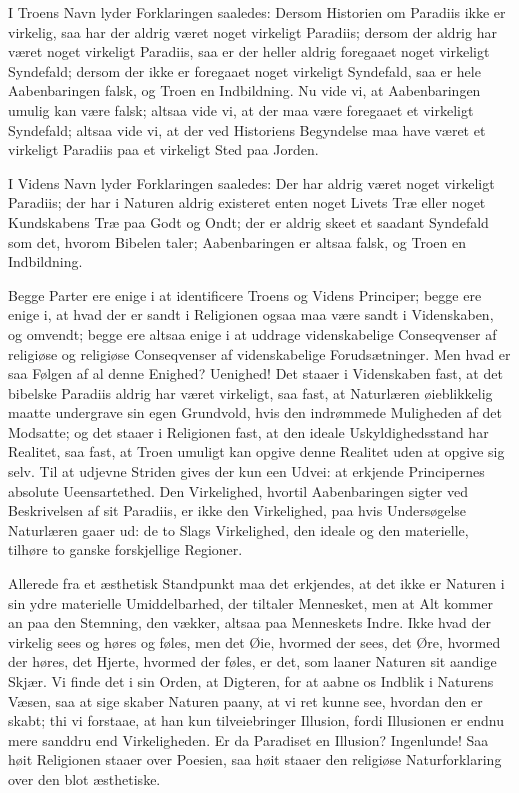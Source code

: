 \documentclass[12pt]{book}
\begin{document}
I Troens Navn lyder Forklaringen saaledes: Dersom Historien om
Paradiis ikke er virkelig, saa har der aldrig været noget virkeligt
Paradiis; dersom der aldrig har været noget virkeligt Paradiis, saa
er der heller aldrig foregaaet noget virkeligt Syndefald; dersom der
ikke er foregaaet noget virkeligt Syndefald, saa er hele
Aabenbaringen falsk, og Troen en Indbildning. Nu vide vi, at
Aabenbaringen umulig kan være falsk; altsaa vide vi, at der maa være
foregaaet et virkeligt Syndefald; altsaa vide vi, at der ved
Historiens Begyndelse maa have været et virkeligt Paradiis paa et
virkeligt Sted paa Jorden.

I Videns Navn lyder Forklaringen saaledes: Der har aldrig været
noget virkeligt Paradiis; der har i Naturen aldrig existeret enten
noget Livets Træ eller noget Kundskabens Træ paa Godt og Ondt; der
er aldrig skeet et saadant Syndefald som det, hvorom Bibelen taler;
Aabenbaringen er altsaa falsk, og Troen en Indbildning.

Begge Parter ere enige i at identificere Troens og Videns Principer;
begge ere enige i, at hvad der er sandt i Religionen ogsaa maa være
sandt i Videnskaben, og omvendt; begge ere altsaa enige i at
uddrage videnskabelige Conseqvenser af religiøse og religiøse
Conseqvenser af videnskabelige Forudsætninger. Men hvad er saa
Følgen af al denne Enighed? Uenighed! Det staaer i Videnskaben
fast, at det bibelske Paradiis aldrig har været virkeligt, saa fast,
at Naturlæren øieblikkelig maatte undergrave sin egen Grundvold,
hvis den indrømmede Muligheden af det Modsatte; og det staaer i
Religionen fast, at den ideale Uskyldighedsstand har Realitet, saa
fast, at Troen umuligt kan opgive denne Realitet uden at opgive sig
selv. Til at udjevne Striden gives der kun een Udvei: at erkjende
Principernes absolute Ueensartethed. Den Virkelighed, hvortil
Aabenbaringen sigter ved
Beskrivelsen af sit Paradiis, er ikke den Virkelighed, paa hvis
Undersøgelse Naturlæren gaaer ud: de to Slags Virkelighed, den
ideale og den materielle, tilhøre to ganske forskjellige Regioner.

Allerede fra et æsthetisk Standpunkt maa det erkjendes, at det ikke
er Naturen i sin ydre materielle Umiddelbarhed, der tiltaler
Mennesket, men at Alt kommer an paa den Stemning, den vækker, altsaa
paa Menneskets Indre. Ikke hvad der virkelig sees og høres og føles,
men det Øie, hvormed der sees, det Øre, hvormed der høres, det
Hjerte, hvormed der føles, er det, som laaner Naturen sit aandige
Skjær. Vi finde det i sin Orden, at Digteren, for at aabne os
Indblik i Naturens Væsen, saa at sige skaber Naturen paany, at vi
ret kunne see, hvordan den er skabt; thi vi forstaae, at han kun
tilveiebringer Illusion, fordi Illusionen er endnu mere sanddru end
Virkeligheden. Er da Paradiset en Illusion? Ingenlunde! Saa høit
Religionen staaer over Poesien, saa høit staaer den religiøse
Naturforklaring over den blot æsthetiske.
\end{document}

